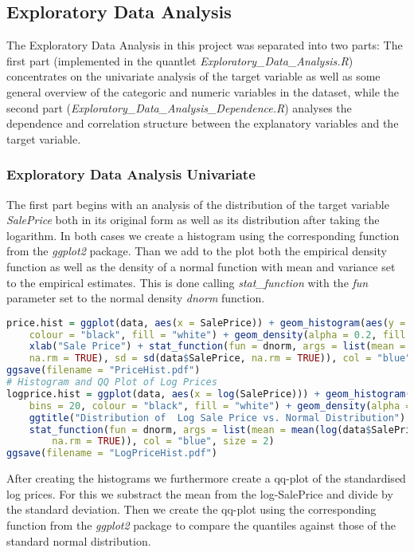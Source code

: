 \subsection{Exploratory Data Analysis}
The Exploratory Data Analysis in this project was separated into two parts: The first part (implemented in the quantlet \textit{Exploratory\_Data\_Analysis.R}) concentrates on the univariate analysis of the target variable as well as some general overview of the categoric and numeric variables in the dataset, while the second part (\textit{Exploratory\_Data\_Analysis\_Dependence.R}) analyses the dependence and correlation structure between the explanatory variables and the target variable. 

\subsubsection{Exploratory Data Analysis Univariate}
The first part begins with an analysis of the distribution of the target variable \textit{SalePrice} both in its original form as well as its distribution after taking the logarithm. In both cases we create a histogram using the corresponding function from the \textit{ggplot2} package. Than we add to the plot both the empirical density function as well as the density of a normal function with mean and variance set to the empirical estimates. This is done calling  \textit{stat\_function} with the \textit{fun} parameter set to the normal density \textit{dnorm} function.
\begin{lstlisting}[language=R]
price.hist = ggplot(data, aes(x = SalePrice)) + geom_histogram(aes(y = ..density..), bins = 20, 
    colour = "black", fill = "white") + geom_density(alpha = 0.2, fill = "#FF6666") + ggtitle("Distribution of Sale Price vs. Normal Distribution") + 
    xlab("Sale Price") + stat_function(fun = dnorm, args = list(mean = mean(data$SalePrice, 
    na.rm = TRUE), sd = sd(data$SalePrice, na.rm = TRUE)), col = "blue", size = 2)
ggsave(filename = "PriceHist.pdf")
# Histogram and QQ Plot of Log Prices
logprice.hist = ggplot(data, aes(x = log(SalePrice))) + geom_histogram(aes(y = ..density..), 
    bins = 20, colour = "black", fill = "white") + geom_density(alpha = 0.2, fill = "#FF6666") + 
    ggtitle("Distribution of  Log Sale Price vs. Normal Distribution") + xlab("Log Sale Price") + 
    stat_function(fun = dnorm, args = list(mean = mean(log(data$SalePrice), na.rm = TRUE), sd = sd(log(data$SalePrice), 
        na.rm = TRUE)), col = "blue", size = 2)
ggsave(filename = "LogPriceHist.pdf")
\end{lstlisting}
After creating the histograms we furthermore create a qq-plot of the standardised log prices. For this we substract the mean from the log-SalePrice and divide by the standard deviation. Then we create the qq-plot using the corresponding function from the \textit{ggplot2} package to compare the quantiles against those of the standard normal distribution.

